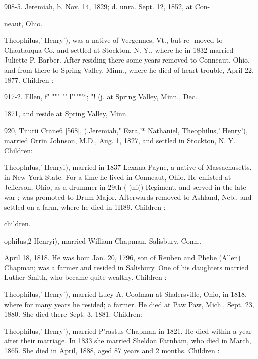 \documentclass[oneside]{book}
\begin{document}
908-5. Jeremiah, b. Nov. 14, 1829; d. unra. Sept. 12, 1852, at Con- 

neaut, Ohio. 







Theophilus,' Henry'), was a native of Vergennes, Vt., but re- 
moved to Chautauqua Co. and settled at Stockton, N. Y., where 
he in 1832 married Juliette P. Barber. After residing there some 
years removed to Conneaut, Ohio, and from there to Spring Valley, 
Minn., where he died of heart trouble, April 22, 1877. Children : 


917-2. Ellen, f" """ "' l'"""'*; "! (j. at Spring Valley, Minn., Dec. 



1871, and reside at Spring Valley, Minn. 

920, Tiiurii Crane6 [568], (.Jeremiah," Ezra,'* Nathaniel,  
Theophilus,' Henry'), married Orrin Johnson, M.D., Aug. 1, 
1827, and settled in Stockton, N. Y. Children: 



Theoplnlus,' Henryi), married in 1837 Lexana Payne, a native 
of Massachusetts, in New York State. For a time he lived in 
Conneaut, Ohio. He enlisted at Jefferson, Ohio, as a drummer 
in 29th ( )hi() Regiment, and served in the late war ; was promoted 
to Drum-Major. Afterwards removed to Ashland, Neb., and 
settled on a farm, where he died in 1H89. Children : 


children. 

ophilus,2 Henryi), married William Chapman, Salisbury, Conn., 




April 18, 1818. He was bom Jan. 20, 1796, son of Reuben and 
Phebe (Allen) Chapman; was a farmer and resided in Salisbury. 
One of his daughters married Luther Smith, who became quite 
wealthy. Children : 









Theophilus,' Henry'), married Lucy A. Coolman at Shalersville, 
Ohio, in 1818, where for many years he resided; a farmer. He 
died at Paw Paw, Mich., Sept. 23, 1880. She died there Sept. 
3, 1881. Children: 





Theophilus,' Henry'), married P'rastus Chapman in 1821. He 
died within a year after their marriage. In 1833 she married 
Sheldon Farnham, who died in March, 1865. She died in April, 
1888, aged 87 years and 2 months. Children : 
\end{document}
